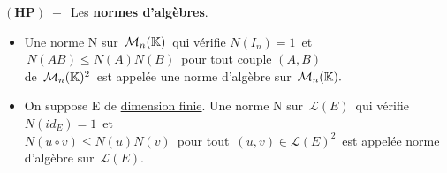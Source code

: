 \(\left(\mathbf{HP}\right)\; -\,\) Les \textbf{normes d'algèbres}.
\begin{itemize}[leftmargin=0.5cm, label=•]
    \item Une norme N sur \(\,\mathcal{M}_n(\mathbb{K})\,\) qui vérifie \(N(I_n)=1\,\) et \(\,N(AB)\leq N(A)N(B)\,\) pour tout couple \((A,B)\)\vspace{0.1cm}\\
    de \(\,\mathcal{M}_n(\mathbb{K})^2\,\) est appelée une norme d'algèbre sur \(\,\mathcal{M}_n(\mathbb{K}).\)\vspace{0.2cm}

    \item On suppose E de \underline{dimension finie}. Une norme N sur \(\,\mathscr{L}(E)\,\) qui vérifie \(N(id_E)=1\,\) et\vspace{0.1cm}\\ 
    \(N(u\circ v)\leq N(u)N(v)\,\) pour tout \(\,(u,v)\in\mathscr{L}(E)^2\,\) est appelée norme d'algèbre sur \(\,\mathscr{L}(E)\).
\end{itemize}

\vspace{1.6cm}

